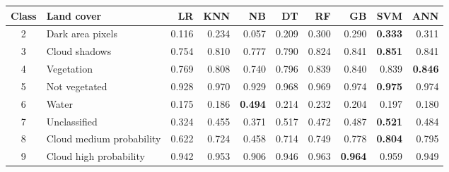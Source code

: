 \begin{tabular}{clrrrrrrrr}
\toprule
Class & Land cover & LR & KNN & NB & DT & RF & GB & SVM & ANN \\
\midrule
2 & Dark area pixels & 0.116 & 0.234 & 0.057 & 0.209 & 0.300 & 0.290 & \textbf{0.333} & 0.311 \\
3 & Cloud shadows & 0.754 & 0.810 & 0.777 & 0.790 & 0.824 & 0.841 & \textbf{0.851} & 0.841 \\
4 & Vegetation & 0.769 & 0.808 & 0.740 & 0.796 & 0.839 & 0.840 & 0.839 & \textbf{0.846} \\
5 & Not vegetated & 0.928 & 0.970 & 0.929 & 0.968 & 0.969 & 0.974 & \textbf{0.975} & 0.974 \\
6 & Water & 0.175 & 0.186 & \textbf{0.494} & 0.214 & 0.232 & 0.204 & 0.197 & 0.180 \\
7 & Unclassified & 0.324 & 0.455 & 0.371 & 0.517 & 0.472 & 0.487 & \textbf{0.521} & 0.484 \\
8 & Cloud medium probability & 0.622 & 0.724 & 0.458 & 0.714 & 0.749 & 0.778 & \textbf{0.804} & 0.795 \\
9 & Cloud high probability & 0.942 & 0.953 & 0.906 & 0.946 & 0.963 & \textbf{0.964} & 0.959 & 0.949 \\
\bottomrule
\end{tabular}

